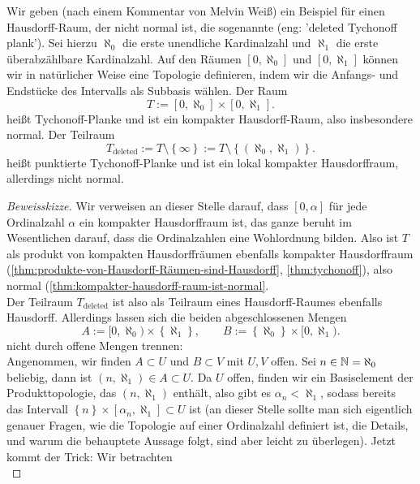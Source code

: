 \begin{example*}

    Wir geben (nach einem Kommentar von {\sc Melvin Weiß}) ein Beispiel für einen Hausdorff-Raum, der nicht normal ist, die sogenannte  (eng: 'deleted Tychonoff plank'). Sei hierzu $\aleph_0$ die erste unendliche Kardinalzahl und $\aleph_1$ die erste überabzählbare Kardinalzahl. Auf den Räumen $[0,\aleph_0]$ und  $[0,\aleph_1]$ können wir in natürlicher Weise eine Topologie definieren, indem wir die Anfangs- und Endstücke des Intervalls als Subbasis wählen. Der Raum
    \[
        T := [0,\aleph_0] \times [0,\aleph_1]
    .\] 
    heißt Tychonoff-Planke und ist ein kompakter Hausdorff-Raum, also insbesondere normal. Der Teilraum
    \[
        T_{\text{deleted}} := T \setminus \left \{\infty\right\}  := T \setminus \left \{(\aleph_0, \aleph_1)\right\} 
    .\] 
    heißt punktierte Tychonoff-Planke und ist ein lokal kompakter Hausdorffraum, allerdings nicht normal.
    \begin{proof}[Beweisskizze]
        Wir verweisen an dieser Stelle darauf, dass $[0,α]$ für jede Ordinalzahl  $α$ ein kompakter Hausdorffraum ist, das ganze beruht im Wesentlichen darauf, dass die Ordinalzahlen eine Wohlordnung bilden. Also ist  $T$ als produkt von kompakten Hausdorffräumen ebenfalls kompakter Hausdorffraum (\autoref{thm:produkte-von-Hausdorff-Räumen-sind-Hausdorff}, \autoref{thm:tychonoff}), also normal (\autoref{thm:kompakter-hausdorff-raum-ist-normal}. \\
        Der Teilraum $T_{\text{deleted}}$ ist also als Teilraum eines Hausdorff-Raumes ebenfalls Hausdorff. Allerdings lassen sich die beiden abgeschlossenen Mengen
        \[
            A:= [0,\aleph_0) \times \left \{\aleph_1\right\}, \qquad B := \left \{\aleph_0\right\} \times [0,\aleph_1)
        .\] 
        nicht durch offene Mengen trennen: \\
        Angenommen, wir finden $A\subset U$ und $B\subset V$ mit $U,V$ offen. Sei  $n\in \mathbb{N} = \aleph_0$ beliebig, dann ist $(n,\aleph_1)\in A\subset U$. Da $U$ offen, finden wir ein Basiselement der Produkttopologie, das  $(n,\aleph_1)$ enthält, also gibt es  $α_n<\aleph_1$, sodass bereits das Intervall  $\left \{n\right\} \times [α_n, \aleph_1] \subset U$ ist (an dieser Stelle sollte man sich eigentlich genauer Fragen, wie die Topologie auf einer Ordinalzahl definiert ist, die Details, und warum die behauptete Aussage folgt, sind aber leicht zu überlegen). Jetzt kommt der Trick: Wir betrachten
        \[
\]
\end{proof}
\end{example*}
